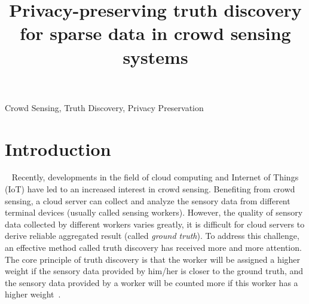 \documentclass[conference]{IEEEtran}
\begin{document}
\title{Privacy-preserving truth discovery for sparse data in crowd sensing systems\\
}

\author{
}
\maketitle

\begin{abstract}

\end{abstract}

\begin{IEEEkeywords}
Crowd Sensing, Truth Discovery, Privacy Preservation
\end{IEEEkeywords}

\section{Introduction}~\label{sec1}
Recently, developments in the field of cloud computing and Internet of Things (IoT) have led to an increased interest in crowd sensing.
Benefiting from crowd sensing, a cloud server can collect and analyze the sensory data from different terminal devices (usually called sensing workers).
However, the quality of sensory data collected by different workers varies greatly, it is difficult for cloud servers to derive reliable aggregated result (called \textit{ground truth}).
To address this challenge, an effective method called truth discovery has received more and more attention.
The core principle of truth discovery is that the worker will be assigned a higher weight if the sensory data provided by him/her is closer to the ground truth, and the sensory data provided by a worker will be counted more if this worker has a higher weight~\cite{miao_cloud-enabled_2015,xu_efficient_2019}.
\end{document}

